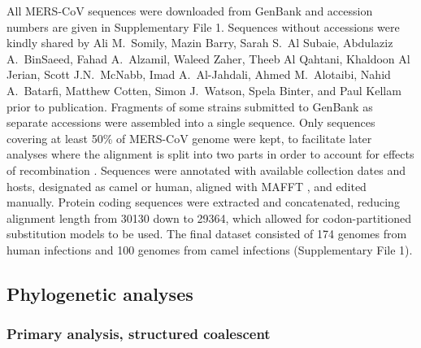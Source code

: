 \documentclass[9pt,lineno]{elife}
\begin{document}
All MERS-CoV sequences were downloaded from GenBank and accession numbers are given in Supplementary File 1.%
Sequences without accessions were kindly shared by Ali M.\ Somily, Mazin Barry, Sarah S.\ Al Subaie, Abdulaziz A.\ BinSaeed, Fahad A.\ Alzamil, Waleed Zaher, Theeb Al Qahtani, Khaldoon Al Jerian, Scott J.N.\ McNabb, Imad A.\ Al-Jahdali, Ahmed M.\ Alotaibi, Nahid A.\ Batarfi, Matthew Cotten, Simon J.\ Watson, Spela Binter, and Paul Kellam prior to publication.
Fragments of some strains submitted to GenBank as separate accessions were assembled into a single sequence.
Only sequences covering at least 50\% of MERS-CoV genome were kept, to facilitate later analyses where the alignment is split into two parts in order to account for effects of recombination \citep{dudas_mers-cov_2016}.
Sequences were annotated with available collection dates and hosts, designated as camel or human, aligned with MAFFT \citep{katoh_mafft_2013}, and edited manually.
Protein coding sequences were extracted and concatenated, reducing alignment length from 30130 down to 29364, which allowed for codon-partitioned substitution models to be used.
The final dataset consisted of 174 genomes from human infections and 100 genomes from camel infections (Supplementary File 1). %

\subsection*{Phylogenetic analyses}

\subsubsection*{Primary analysis, structured coalescent}
\end{document}
